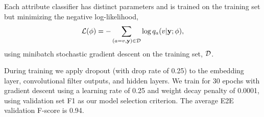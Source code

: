 Each attribute classifier has distinct parameters and is trained on the 
training set but minimizing the negative log-likelihood, 
\[\mathcal{L}(\phi) = -\sum_{(a=v, \mathbf{y}) \in \mathcal{D}} \log q_{a}(v| \mathbf{y};\phi),  \]
 using minibatch stochastic gradient descent on the training set, $\mathcal{D}$.

During training we apply dropout (with drop rate of 0.25) to 
the embedding layer, convolutional filter outputs, and hidden
layers. We train for 30 epochs with gradient descent
using  a learning rate of 0.25 and 
weight decay penalty of 0.0001, using validation set F1
as our model selection criterion.
The average E2E validation F-score is 0.94.


%
%
%
%
%
